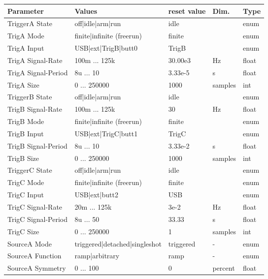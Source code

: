 			\begin{table}[H]
			\centering
			\scriptsize
			\begin{tabular}{l|p{65mm}|l|l|l}
			\redrow Parameter 	& Values						& reset value 	& Dim.		& Type 	\\ \hline
			TriggerA State		& off|idle|arm|run				& idle			& 			& enum	\\ \hline
			TrigA Mode			& finite|infinite (freerun)		& finite		& 			& enum	\\ \hline
			TrigA Input			& USB|ext|TrigB|butt0 			& TrigB			& 			& enum	\\ \hline
			TrigA Signal-Rate	& 100m ... 125k					& 30.00e3		& Hz		& float	\\ \hline
			TrigA Signal-Period	& 8u ... 10						& 3.33e-5		& s			& float	\\ \hline
			TrigA Size			& 0	... 250000	 				& 1000			& samples	& int	\\ \hline
			TriggerB State		& off|idle|arm|run 				& idle			& 			& enum	\\ \hline
			TrigB Signal-Rate	& 100m ... 125k					& 30			& Hz		& float	\\ \hline
			TrigB Mode			& finite|infinite (freerun)		& finite		& 			& enum	\\ \hline
			TrigB Input			& USB|ext|TrigC|butt1 			& TrigC			& 			& enum	\\ \hline
			TrigB Signal-Period	& 8u ... 10						& 3.33e-2		& s			& float	\\ \hline
			TrigB Size			& 0	... 250000	 				& 1000			& samples	& int	\\ \hline
			TriggerC State		& off|idle|arm|run				& idle			& 			& enum	\\ \hline
			TrigC Mode			& finite|infinite (freerun)		& finite		& 			& enum	\\ \hline
			TrigC Input			& USB|ext|butt2					& USB			& 			& enum	\\ \hline
			TrigC Signal-Rate	& 20m ... 125k					& 3e-2			& Hz		& float	\\ \hline
			TrigC Signal-Period	& 8u ... 50						& 33.33			& s			& float	\\ \hline
			TrigC Size			& 0 ... 250000					& 1				& samples	& int	\\ \hline
			SourceA Mode		& triggered|detached|singleshot	& triggered		& -			& enum	\\ \hline
			SourceA Function	& ramp|arbitrary 				& ramp			& -			& enum	\\ \hline
			SourceA Symmetry	& 	0 ... 100					& 0				& percent	& float	\\ \hline

\end{tabular}
\end{table}
